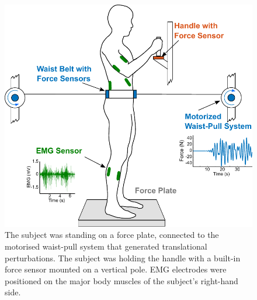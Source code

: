 \documentclass[final,5p,twocolumn]{elsarticle}
\begin{document}

\begin{figure}
	\begin{center}
		\includegraphics[width=\linewidth]{images/exp2_protocol.pdf}
		\caption{The subject was standing on a force plate, connected to the motorised waist-pull system that generated translational perturbations. The subject was holding the handle with a built-in force sensor mounted on a vertical pole. EMG electrodes were positioned on the major body muscles of the subject's right-hand side.}
		\label{fig:exp2_protocol}
	\end{center}
\end{figure}


\end{document}
